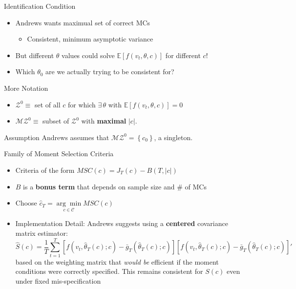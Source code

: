 \begin{frame}{Identification Condition}
  \begin{itemize}
    \item Andrews wants maximual set of correct MCs
      \begin{itemize}
        \item Consistent, minimum asymptotic variance
      \end{itemize}
    \item But different $\theta$ values could solve $\mathbb{E}[f(v_t,\theta,c)]$ for different $c$!
    \item Which $\theta_0$ are we actually trying to be consistent for?
  \end{itemize}

  \begin{block}{More Notation}
    \begin{itemize}
      \item $\mathcal{Z}^0 \equiv$ set of all $c$ for which $\exists\, \theta$ with $\mathbb{E}[f(v_t,\theta,c)]=0$ 
      \item $\mathcal{MZ}^0 \equiv$ subset of $\mathcal{Z}^0$ with \textbf{maximal} $|c|$.
    \end{itemize}
  \end{block}

  \vspace{-1em}
  \begin{block}{Assumption}
    Andrews assumes that $\mathcal{MZ}^0 = \left\{ c_0 \right\}$, a singleton.
  \end{block}
\end{frame}
\begin{frame}{Family of Moment Selection Criteria}

  \footnotesize
  \begin{itemize}
    \item Criteria of the form $MSC(c) = J_T(c) - B(T,|c|)$
    \item $B$ is a \textbf{bonus term} that depends on sample size and \# of MCs
    \item Choose $\widehat{c}_T = \underset{c \in \mathcal{C}}{\arg\min} MSC(c)$
    \item Implementation Detail: Andrews suggests using a \textbf{centered} covariance matrix estimator:
	$$\widehat{S}(c) = \frac{1}{T} \sum_{t=1}^T \left[f(v_t, \widehat{\theta}_T(c);c) - \bar{g}_T(\widehat{\theta}_T(c); c) \right]\left[f(v_t, \widehat{\theta}_T(c);c) - \bar{g}_T(\widehat{\theta}_T(c); c) \right]'$$
  based on the weighting matrix that \emph{would be} efficient if the moment conditions were correctly specified.  
  This remains consistent for $S(c)$ even under fixed mis-specification
  \end{itemize}


\end{frame}
